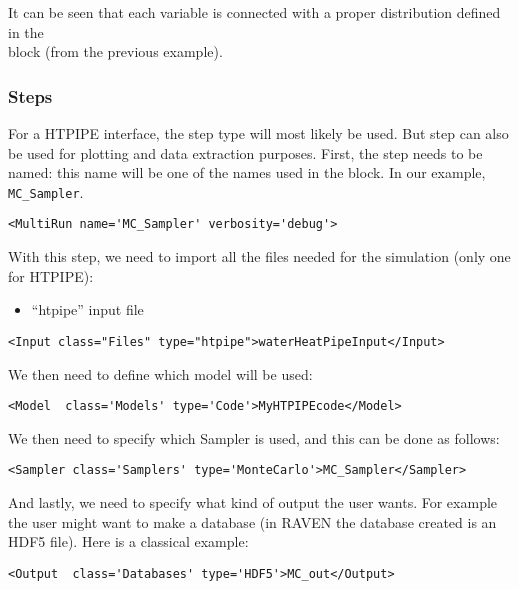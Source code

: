 \noindent It can be seen that each variable is connected with a proper distribution
defined in the \\ block (from the previous example).

\subsubsection{Steps}
For a HTPIPE interface, the  step type will most likely be
used. But  step can also be used for plotting and data extraction purposes.
%
First, the step needs to be named: this name will be one of the names used in
the  block.
%
In our example,  \texttt{MC\_Sampler}.
%
\begin{lstlisting}[style=XML,morekeywords={name,debug,re-seeding}]
     <MultiRun name='MC_Sampler' verbosity='debug'>
\end{lstlisting}

With this step, we need to import all the files needed for the simulation (only one for HTPIPE):
\begin{itemize}
  \item ``htpipe'' input file
\end{itemize}
\begin{lstlisting}[style=XML,morekeywords={name,class,type}]
    <Input class="Files" type="htpipe">waterHeatPipeInput</Input>
\end{lstlisting}
We then need to define which model will be used:
\begin{lstlisting}[style=XML]
    <Model  class='Models' type='Code'>MyHTPIPEcode</Model>
\end{lstlisting}
We then need to specify which Sampler is used, and this can be done as follows:
\begin{lstlisting}[style=XML]
    <Sampler class='Samplers' type='MonteCarlo'>MC_Sampler</Sampler>
\end{lstlisting}
And lastly, we need to specify what kind of output the user wants.
%
For example the user might want to make a database (in RAVEN the database
created is an HDF5 file).
%
Here is a classical example:
\begin{lstlisting}[style=XML,morekeywords={class,type}]
    <Output  class='Databases' type='HDF5'>MC_out</Output>
\end{lstlisting}

